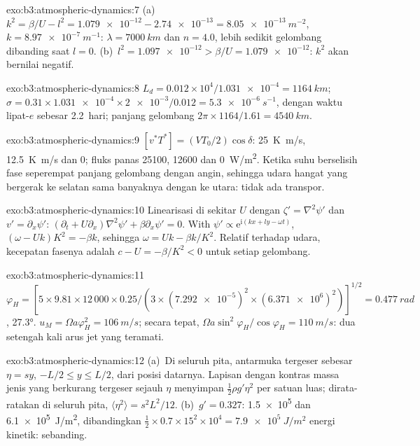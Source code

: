 \begin{solution}{exo:b3:atmospheric-dynamics:7}
(a)~$k^2 = \beta/U - l^2 = \num{1.079e-12} - \num{2.74e-13} =
\qty{8.05e-13}{m^{-2}}$, $k = \qty{8.97e-7}{m^{-1}}$: $\lambda =
\qty{7000}{km}$ dan $n = 4.0$, lebih sedikit gelombang dibanding saat $l = 0$. (b)~$l^2 =
\num{1.097e-12} > \beta/U = \num{1.079e-12}$: $k^2$ akan bernilai negatif.
\end{solution}

\begin{solution}{exo:b3:atmospheric-dynamics:8}
$L_d = 0.012\times10^4/\num{1.031e-4} = \qty{1164}{km}$; $\sigma =
0.31\times\num{1.031e-4}\times\num{2e-3}/0.012 = \qty{5.3e-6}{s^{-1}}$, dengan
waktu lipat-$e$ sebesar \num{2.2}~hari; panjang gelombang $2\pi\times1164/1.61 =
\qty{4540}{km}$.
\end{solution}

\begin{solution}{exo:b3:atmospheric-dynamics:9}
$[v^*T^*] = (VT_0/2)\cos\delta$: \qty{25}{K.m/s}, \qty{12.5}{K.m/s} dan 0;
fluks panas \num{25100}, \num{12600} dan \qty{0}{W/m^2}. Ketika
suhu berselisih fase seperempat panjang gelombang dengan angin, sehingga udara hangat
yang bergerak ke selatan sama banyaknya dengan ke utara: tidak ada transpor.
\end{solution}

\begin{solution}{exo:b3:atmospheric-dynamics:10}
Linearisasi di sekitar $U$ dengan $\zeta' = \nabla^2\psi'$ dan $v' =
\partial_x\psi'$: $(\partial_t + U\partial_x)\nabla^2\psi' + \beta\partial_x
\psi' = 0$. With $\psi' \propto \mathrm e^{\mathrm i(kx + ly - \omega t)}$,
$(\omega - Uk)K^2 = -\beta k$, sehingga $\omega = Uk - \beta k/K^2$. Relatif terhadap
udara, kecepatan fasenya adalah $c - U = -\beta/K^2 < 0$ untuk setiap gelombang.
\end{solution}

\begin{solution}{exo:b3:atmospheric-dynamics:11}
$\varphi_H = [5\times9.81\times12\,000\times0.25/(3\times(\num{7.292e-5})^2
\times(\num{6.371e6})^2)]^{1/2} = \qty{0.477}{rad}$, \ang{27.3}.
$u_M = \Omega a\varphi_H^2 = \qty{106}{m/s}$; secara tepat, $\Omega a\sin^2
\varphi_H/\cos\varphi_H = \qty{110}{m/s}$: dua setengah kali
arus jet yang teramati.
\end{solution}

\begin{solution}{exo:b3:atmospheric-dynamics:12}
(a)~Di seluruh pita, antarmuka tergeser sebesar $\eta = sy$, $-L/2 \le y
\le L/2$, dari posisi datarnya. Lapisan dengan kontras massa jenis yang berkurang
tergeser sejauh $\eta$ menyimpan $\tfrac12\rho g'\eta^2$ per satuan luas; dirata-ratakan
di seluruh pita, $\langle\eta^2\rangle = s^2L^2/12$. (b)~$g' = 0.327$:
\num{1.5e5} dan \qty{6.1e5}{J/m^2}, dibandingkan $\tfrac12\times0.7\times15^2
\times10^4 = \qty{7.9e5}{J/m^2}$ energi kinetik: sebanding.
\end{solution}

